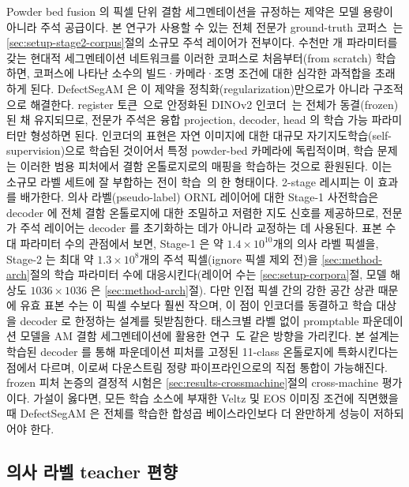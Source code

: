 Powder bed fusion 의 픽셀 단위 결함 세그멘테이션을 규정하는 제약은 모델
용량이 아니라 주석 공급이다. 본 연구가 사용할 수 있는 전체 전문가
ground-truth 코퍼스~\cite{Peregrine_v2021_03,Peregrine_v2022_10}는
\ref{sec:setup-stage2-corpus}절의 소규모 주석 레이어가 전부이다. 수천만 개
파라미터를 갖는 현대적 세그멘테이션 네트워크를 이러한 코퍼스로
처음부터(from scratch) 학습하면, 코퍼스에 나타난 소수의 빌드·카메라·조명
조건에 대한 심각한 과적합을 초래하게 된다. DefectSegAM 은 이 제약을
정칙화(regularization)만으로가 아니라 구조적으로 해결한다. register
토큰~\cite{Darcet2024Registers}으로 안정화된 DINOv2
인코더~\cite{Oquab2024DINOv2}는 전체가 동결(frozen)된 채 유지되므로,
전문가 주석은 융합 projection, decoder, head 의 학습 가능 파라미터만
형성하면 된다. 인코더의 표현은 자연 이미지에 대한 대규모
자기지도학습(self-supervision)으로 학습된 것이어서 특정 powder-bed
카메라에 독립적이며, 학습 문제는 이러한 범용 피처에서 결함 온톨로지로의
매핑을 학습하는 것으로 환원된다. 이는 소규모 라벨 세트에 잘 부합하는 전이
학습~\cite{Pan2010TransferLearning}의 한 형태이다. 2-stage 레시피는 이
효과를 배가한다. 의사 라벨(pseudo-label) ORNL 레이어에 대한 Stage-1
사전학습은 decoder 에 전체 결함 온톨로지에 대한 조밀하고 저렴한 지도
신호를 제공하므로, 전문가 주석 레이어는 decoder 를 초기화하는 데가
아니라 교정하는 데 사용된다. 표본 수 대 파라미터 수의 관점에서 보면,
Stage-1 은 약 $1.4 \times 10^{10}$개의 의사 라벨 픽셀을, Stage-2 는 최대
약 $1.3 \times 10^{8}$개의 주석 픽셀(ignore 픽셀 제외 전)을
\ref{sec:method-arch}절의 학습 파라미터 수에 대응시킨다(레이어 수는
\ref{sec:setup-corpora}절, 모델 해상도 $1036 \times 1036$ 은
\ref{sec:method-arch}절). 다만 인접 픽셀 간의 강한 공간 상관 때문에
유효 표본 수는 이 픽셀 수보다 훨씬 작으며, 이 점이 인코더를
동결하고 학습 대상을 decoder 로 한정하는 설계를 뒷받침한다. 태스크별 라벨 없이 promptable 파운데이션
모델을 AM 결함 세그멘테이션에 활용한 연구~\cite{Era2025SAM}도 같은 방향을
가리킨다. 본 설계는 학습된 decoder 를 통해 파운데이션 피처를 고정된
11-class 온톨로지에 특화시킨다는 점에서 다르며, 이로써 다운스트림 정량
파이프라인으로의 직접 통합이 가능해진다. frozen 피처 논증의 결정적 시험은
\ref{sec:results-crossmachine}절의 cross-machine 평가이다. 가설이 옳다면,
모든 학습 소스에 부재한 Veltz 및 EOS 이미징 조건에 직면했을 때
DefectSegAM 은 전체를 학습한 합성곱 베이스라인보다 더 완만하게 성능이
저하되어야 한다.

\subsection{의사 라벨 teacher 편향}
\label{sec:discussion-teacher}

